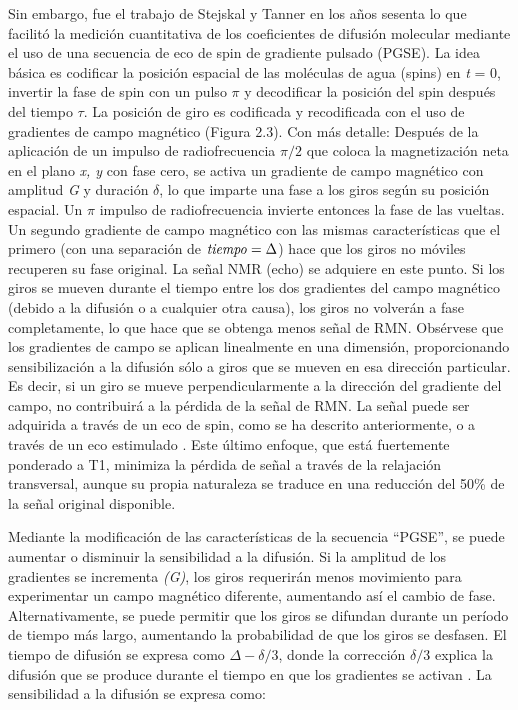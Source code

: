 \documentclass[12pt,a5,twoside]{book}
\begin{document}
Sin embargo, fue el trabajo de Stejskal y Tanner \citep{Stejskal_1965} en los años sesenta lo que facilitó la medición cuantitativa de los coeficientes de difusión molecular mediante el uso de una secuencia de eco de spin de gradiente pulsado (PGSE). La idea básica es codificar la posición espacial de las moléculas de agua (spins) en {\it t} = 0, invertir la fase de spin con un pulso \(\pi\) y decodificar la posición del spin después del tiempo \(\tau\). La posición de giro es codificada y recodificada con el uso de gradientes de campo magnético (Figura 2.3). Con más detalle: Después de la aplicación de un impulso de radiofrecuencia $\pi/2$ que coloca la magnetización neta en el plano {\it x, y} con fase cero, se activa un gradiente de campo magnético con amplitud {\it G} y duración \(\delta\), lo que imparte una fase a los giros según su posición espacial. Un \(\pi\) impulso de radiofrecuencia invierte entonces la fase de las vueltas. Un segundo gradiente de campo magnético con las mismas características que el primero (con una separación de ${\it tiempo} = \Delta$) hace que los giros no móviles recuperen su fase original. La señal NMR (echo) se adquiere en este punto. Si los giros se mueven durante el tiempo entre los dos gradientes del campo magnético (debido a la difusión o a cualquier otra causa), los giros no volverán a fase completamente, lo que hace que se obtenga menos señal de RMN. Obsérvese que los gradientes de campo se aplican linealmente en una dimensión, proporcionando sensibilización a la difusión sólo a giros que se mueven en esa dirección particular. Es decir, si un giro se mueve perpendicularmente a la dirección del gradiente del campo, no contribuirá a la pérdida de la señal de RMN. La señal puede ser adquirida a través de un eco de spin, como se ha descrito anteriormente, o a través de un eco estimulado \citep{Tanner_1970}. Este último enfoque, que está fuertemente ponderado a T1, minimiza la pérdida de señal a través de la relajación transversal, aunque su propia naturaleza se traduce en una reducción del 50\% de la señal original disponible.

Mediante la modificación de las características de la secuencia ``PGSE'', se puede aumentar o disminuir la sensibilidad a la difusión. Si la amplitud de los gradientes se incrementa {\it (G)}, los giros requerirán menos movimiento para experimentar un campo magnético diferente, aumentando así el cambio de fase. Alternativamente, se puede permitir que los giros se difundan durante un período de tiempo más largo, aumentando la probabilidad de que los giros se desfasen. El tiempo de difusión se expresa como $\Delta - \delta/3$, donde la corrección $\delta/3$ explica la difusión que se produce durante el tiempo en que los gradientes se activan \citep{Stejskal_1965}. La sensibilidad a la difusión se expresa como:
\end{document}
